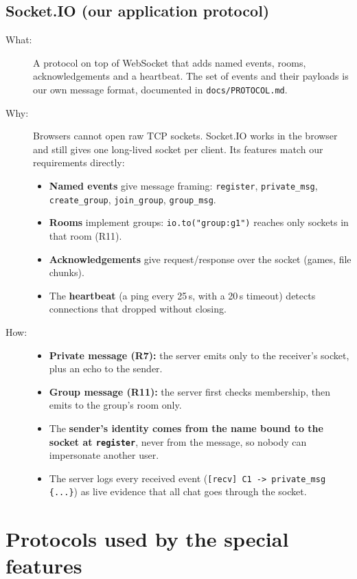 \documentclass[11pt,a4paper]{article}
\newcommand{\code}[1]{\texttt{#1}}
\begin{document}
\subsection{Socket.IO (our application protocol)}
\begin{description}
  \item[What:] A protocol on top of WebSocket that adds named events, rooms,
    acknowledgements and a heartbeat. The set of events and their payloads is
    our own message format, documented in \code{docs/PROTOCOL.md}.
  \item[Why:] Browsers cannot open raw TCP sockets. Socket.IO works in the
    browser and still gives one long-lived socket per client. Its features match
    our requirements directly:
    \begin{itemize}
      \item \textbf{Named events} give message framing: \code{register},
        \code{private\_msg}, \code{create\_group}, \code{join\_group}, \code{group\_msg}.
      \item \textbf{Rooms} implement groups: \code{io.to("group:g1")} reaches
        only sockets in that room (R11).
      \item \textbf{Acknowledgements} give request/response over the socket (games, file chunks).
      \item The \textbf{heartbeat} (a ping every 25\,s, with a 20\,s timeout)
        detects connections that dropped without closing.
    \end{itemize}
  \item[How:]
    \begin{itemize}
      \item \textbf{Private message (R7):} the server emits only to the
        receiver's socket, plus an echo to the sender.
      \item \textbf{Group message (R11):} the server first checks membership,
        then emits to the group's room only.
      \item The \textbf{sender's identity comes from the name bound to the socket
        at \code{register}}, never from the message, so nobody can impersonate another user.
      \item The server logs every received event
        (\code{[recv] C1 -> private\_msg \{...\}}) as live evidence that all chat
        goes through the socket.
    \end{itemize}
\end{description}

\section{Protocols used by the special features}
\end{document}
